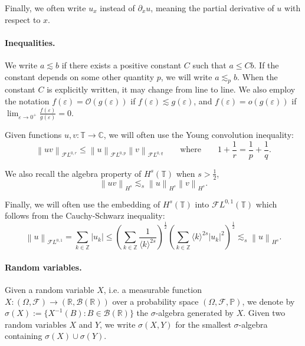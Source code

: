\documentclass[a4paper,10pt,reqno]{article}
\theoremstyle{definition}
\theoremstyle{plain}
\theoremstyle{plain}
\theoremstyle{definition}
\theoremstyle{plain}
\theoremstyle{plain}
\theoremstyle{plain}
\theoremstyle{definition}
\theoremstyle{definition}
\newcommand{\norm}[1]{\left\lVert #1 \right\rVert}
\def \Z{\mathbb Z}
\def \R{\mathbb R}
\def \C{\mathbb C}
\def \P{{\mathbb P}}
\def \O{\mathcal{O}}
\def \T{\mathbb{T}}
\def \FL{\mathcal{F}L}
\begin{document}
Finally, we often write $u_x$ instead of $\partial_x u$, meaning the partial derivative of $u$ with respect to $x$.

\paragraph{Inequalities.} We  write $a \lesssim b$ if there exists a positive constant $C$ such that $a \le Cb$. If the constant depends on some other quantity $p$, we will write $a \lesssim_p b.$ When the constant $C$ is explicitly written, it may change from line to line. We also employ the notation $f(\varepsilon)=\O( g(\varepsilon))$ if $f(\varepsilon)\lesssim g(\varepsilon)$, and $f(\varepsilon)=o(g(\varepsilon))$ if $\lim_{\varepsilon\rightarrow 0^{+}} \frac{f(\varepsilon)}{g(\varepsilon)} =0$.

Given functions $u,v:\T \rightarrow \C$, we will often use the Young convolution inequality:
\begin{equation}
\norm{uv}_{\FL^{0,r}} \le \norm{u}_{\FL^{0,p}} \norm{v}_{\FL^{0,q}} \qquad \text{where} \qquad 1+\frac{1}{r} = \frac{1}{p} + \frac{1}{q}.
\label{young convolution inequality}
\end{equation}

We also recall the algebra property of $H^s(\T)$ when $s > \frac{1}{2}$, 
\[
\norm{uv}_{H^s} \lesssim_s \norm{u}_{H^s} \norm{v}_{H^s}.
\]

Finally, we will often use the embedding of $H^s(\T)$ into $\FL^{0,1}(\T)$ which follows from the Cauchy-Schwarz inequality:
\begin{equation}
\norm{u}_{\FL^{0,1}} = \sum_{k \in \Z} |u_k| \le \left ( \sum_{k \in \Z} \frac{1}{\langle k \rangle^{2s}} \right )^{\frac{1}{2}} \left ( \sum_{k \in \Z} \langle k \rangle^{2s} |u_k|^2 \right )^{\frac{1}{2}} \lesssim_s \norm{u}_{H^s}.
\label{eq: embedding hs in fl01}
\end{equation}


\paragraph{Random variables.} Given a random variable $X$, i.e. a measurable function $X :(\mathbb{\Omega},\mathcal{F}) \to (\R, \mathcal{B}(\R) )$ over a probability space 
$(\mathbb{\Omega}, \mathcal{F}, \P)$, we denote by $\sigma(X):=\{ X^{-1}(B) \colon B \in \mathcal{B}(\R)\}$ the $\sigma$-algebra generated by $X$. Given two random variables $X$ and $Y$, we write $\sigma(X,Y)$ for the smallest $\sigma$-algebra containing $\sigma(X) \cup \sigma(Y)$. 
\end{document}
